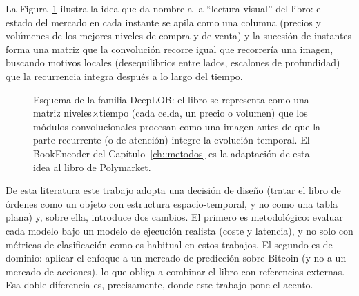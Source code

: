 La Figura~\ref{fig::deeplob_esquema} ilustra la idea que da nombre a la ``lectura visual''
del libro: el estado del mercado en cada instante se apila como una columna (precios y
volúmenes de los mejores niveles de compra y de venta) y la sucesión de instantes forma
una matriz que la convolución recorre igual que recorrería una imagen, buscando motivos
locales (desequilibrios entre lados, escalones de profundidad) que la recurrencia integra
después a lo largo del tiempo.

\begin{figure}[htbp]
\centering
{}
\caption[La ``lectura visual'' del libro de órdenes]{Esquema de la familia DeepLOB: el libro
se representa como una matriz niveles$\times$tiempo (cada celda, un precio o volumen) que
los módulos convolucionales procesan como una imagen antes de que la parte recurrente (o
de atención) integre la evolución temporal. El BookEncoder del Capítulo~\ref{ch::metodos}
es la adaptación de esta idea al libro de Polymarket.}
\label{fig::deeplob_esquema}
\end{figure}

De esta literatura este trabajo adopta una decisión de diseño (tratar el libro de órdenes
como un objeto con estructura espacio-temporal, y no como una tabla plana) y, sobre ella,
introduce dos cambios. El primero es metodológico: evaluar cada modelo bajo un modelo de
ejecución realista (coste y latencia), y no solo con métricas de clasificación como es
habitual en estos trabajos. El segundo es de dominio: aplicar el enfoque a un mercado de
predicción sobre Bitcoin (y no a un mercado de acciones), lo que obliga a combinar el libro
con referencias externas. Esa doble diferencia es, precisamente, donde este trabajo pone el
acento.

